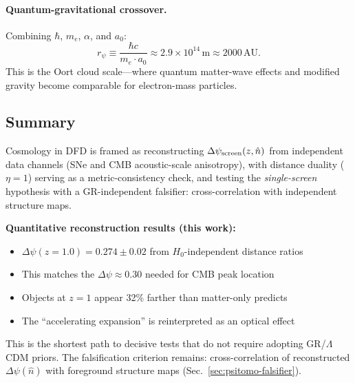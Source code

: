 \paragraph{Quantum-gravitational crossover.}
Combining $\hbar$, $m_e$, $\alpha$, and $a_0$:
\begin{equation}
r_\psi \equiv \frac{\hbar c}{m_e \cdot a_0} \approx 2.9 \times 10^{14}\,\text{m} \approx 2000\,\text{AU}.
\end{equation}
This is the Oort cloud scale---where quantum matter-wave effects and modified 
gravity become comparable for electron-mass particles.

\subsection{Summary}\label{sec:cosmo-summary}

Cosmology in DFD is framed as reconstructing $\Delta\psi_{\rm screen}(z,\hat n)$ from independent data channels (SNe and CMB acoustic-scale anisotropy), with distance duality ($\eta=1$) serving as a metric-consistency check, and testing the \emph{single-screen} hypothesis with a GR-independent falsifier: cross-correlation with independent structure maps.

\textbf{Quantitative reconstruction results (this work):}
\begin{itemize}
\item $\Delta\psi(z=1.0) = 0.274 \pm 0.02$ from $H_0$-independent distance ratios
\item This matches the $\Delta\psi \approx 0.30$ needed for CMB peak location
\item Objects at $z=1$ appear 32\% farther than matter-only predicts
\item The ``accelerating expansion'' is reinterpreted as an optical effect
\end{itemize}

This is the shortest path to decisive tests that do not require adopting GR/$\Lambda$CDM priors. The falsification criterion remains: cross-correlation of reconstructed $\Delta\psi(\hat n)$ with foreground structure maps (Sec.~\ref{sec:psitomo-falsifier}).
